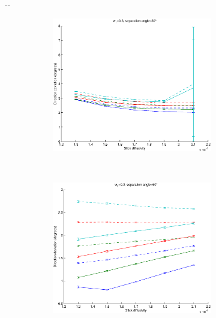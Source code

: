 \documentclass{article}
\begin{document}
\begin{figure}[H]
\begin{adjustwidth}{-\oddsidemargin}{-\rightmargin}
    \begin{subfigure}{0.8\paperwidth}
      \begin{subfigure}{0.3\textwidth}
        \centering
        \includegraphics[width=\textwidth]{figures/synth_bas_weights__snr=20__w1=3__angle=30.eps}
      \end{subfigure}
      ~
      \begin{subfigure}{0.3\textwidth}
        \centering
        \includegraphics[width=\textwidth]{figures/synth_bas_weights__snr=20__w1=3__angle=60.eps}
      \end{subfigure}

\end{subfigure}
\end{adjustwidth}
\end{figure}
\end{document}
